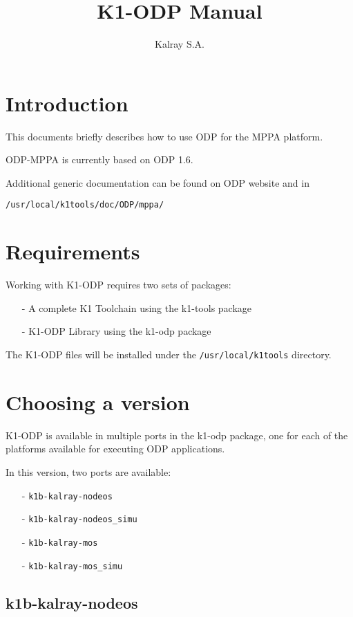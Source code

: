 \documentclass{trkalray}
\author{%
Kalray S.A.\autref{1}
}
\institute{%
\autlabel{1} \email{support@kalray.eu},
Kalray S.A.
}
\title{K1-ODP Manual}
\begin{document}
\maketitle

\tableofcontents

\newpage
\section{Introduction}

This documents briefly describes how to use ODP for the MPPA platform.

ODP-MPPA is currently based on ODP 1.6.

Additional generic documentation can be found on ODP website and in
\begin{lstlisting}
/usr/local/k1tools/doc/ODP/mppa/
\end{lstlisting}

\section{Requirements}

Working with K1-ODP requires two sets of packages:
\begin{itemize}
\item[-]{A complete K1 Toolchain using the k1-tools package}
\item[-]{K1-ODP Library using the k1-odp package}
\end{itemize}

The K1-ODP files will be installed under the
\texttt{/usr/local/k1tools} directory.

\section{Choosing a version}
K1-ODP is available in multiple ports in the k1-odp package, one for
each of the platforms available for executing ODP applications.

In this version, two ports are available:
\begin{itemize}
\item[-]{\texttt{k1b-kalray-nodeos}}
\item[-]{\texttt{k1b-kalray-nodeos\_simu}}
\item[-]{\texttt{k1b-kalray-mos}}
\item[-]{\texttt{k1b-kalray-mos\_simu}}
\end{itemize}

\subsection{k1b-kalray-nodeos}
\end{document}
